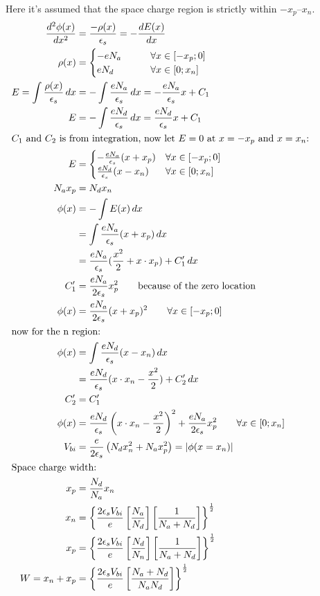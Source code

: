 \begin{columns}
{Here it's assumed that the space charge region is strictly within $-x_p$--$x_n$.
\begin{align*}
        \frac{d^2\phi(x)}{dx^2}&=\frac{-\rho(x)}{\epsilon_s}=-\frac{dE(x)}{dx}\\
        \rho(x)&= 
        \begin{cases}
                -eN_a\qquad&\forall x \in [-x_p;0]\\
                eN_d\qquad &\forall x \in [0;x_n]
        \end{cases}\\
        E=\int \frac{\rho(x)}{\epsilon_s}\,dx&=-\int \frac{eN_a}{\epsilon_s}\,dx=-\frac{eN_a}{\epsilon_s}x+C_1\\
        E&=-\int \frac{eN_d}{\epsilon_s}\,dx=\frac{eN_d}{\epsilon_s}x+C_1\\
        \intertext{$C_1$ and $C_2$ is from integration, now let $E=0$ at $x=-x_p$ and $x=x_n$:}
        E&= 
        \begin{cases}
                -\frac{eN_a}{\epsilon_s}(x+x_p)&\forall x\in [-x_p;0]\\
                \frac{eN_d}{\epsilon_s}(x-x_n)&\forall x\in [0;x_n]
        \end{cases}\\
        N_ax_p&=N_dx_n\\
        \phi(x) &=-\int E(x) \, dx \\
        &=\int \frac{eN_a}{\epsilon_s}(x+x_p)\,dx\\
        &=\frac{eN_a}{\epsilon_s}(\frac{x^2}{2}+ x\cdot x_p)+C_1'\,dx\\
        C_1'&=\frac{eN_a}{2\epsilon_s}x_p^2\qquad\textup{because of the zero location}\\
        \phi(x)&= \frac{eN_a}{2\epsilon_s}(x+x_p)^2\qquad\forall x\in\left[ -x_p;0 \right]\\
        \intertext{now for the n region:}
        \phi(x)&=\int \frac{eN_d}{\epsilon_s}(x-x_n)\,dx\\
        &=\frac{eN_d}{\epsilon_s}(x\cdot x_n-\frac{x^2}{2} )+C_2'\,dx\\
         C_2'&=C_1'\\
        \phi(x)&= \frac{eN_d}{\epsilon_s}\left(x\cdot x_n-\frac{x^2}{2}\right)^2+ \frac{eN_a}{2\epsilon_s}x_p^2\qquad\forall x\in\left[ 0;x_n \right]\\
        V_{bi}&=\frac{e}{2\epsilon_s}\left( N_dx_n^2+N_ax_p^2 \right)=\lvert\phi(x=x_n)\rvert\\
        \intertext{Space charge width:}
        x_p&=\frac{N_d}{N_a}x_n\\
        x_n&=\left\{ \frac{2\epsilon_s V_{bi}}{e}\left[ \frac{N_a}{N_d} \right]\left[ \frac{1}{N_a+N_d} \right] \right\}^{\frac{1}{2}}\\
        x_p&=\left\{ \frac{2\epsilon_s V_{bi}}{e}\left[ \frac{N_d}{N_n} \right]\left[ \frac{1}{N_a+N_d} \right] \right\}^{\frac{1}{2}}\\
        W=x_n+x_p&=\left\{ \frac{2\epsilon_{s}V_{bi}}{e}\left[ \frac{N_a+N_d}{N_aN_d} \right] \right\}^{\frac{1}{2}}
\end{align*}}
        \end{columns}


